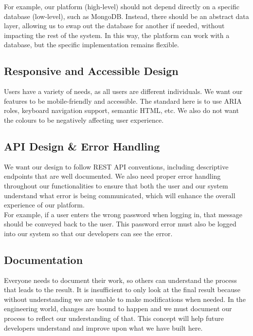 \documentclass{article}
\begin{document}
\noindent For example, our platform (high-level) should not depend directly on a specific database (low-level), such as MongoDB. Instead, there should be an abstract data layer, allowing us to swap out the database for another if needed, without impacting the rest of the system. In this way, the platform can work with a database, but the specific implementation remains flexible.

\subsection*{Responsive and Accessible Design}

Users have a variety of needs, as all users are different individuals. We want our features to be mobile-friendly and accessible. The standard here is to use ARIA roles, keyboard navigation support, semantic HTML, etc. We also do not want the colours to be negatively affecting user experience.

\subsection*{API Design \& Error Handling}

We want our design to follow REST API conventions, including descriptive endpoints that are well documented. We also need proper error handling throughout our functionalities to ensure that both the user and our system understand what error is being communicated, which will enhance the overall experience of our platform. \\

\noindent For example, if a user enters the wrong password when logging in, that message should be conveyed back to the user. This password error must also be logged into our system so that our developers can see the error.

\subsection*{Documentation}

Everyone needs to document their work, so others can understand the process that leads to the result. It is insufficient to only look at the final result because without understanding we are unable to make modifications when needed. In the engineering world, changes are bound to happen and we must document our process to reflect our understanding of that. This concept will help future developers understand and improve upon what we have built here.
\end{document}

